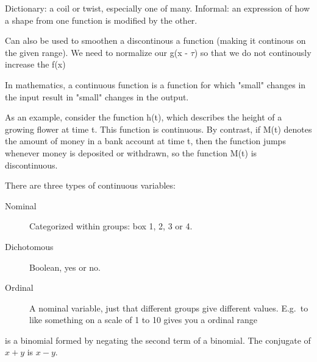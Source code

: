 \begin{definition}[Convolution]
    Dictionary: a coil or twist, especially one of many.\newline
    Informal: an expression of how a shape from one function is modified by 
        the other.

    Can also be used to smoothen a discontinous a function (making it continous 
    on the given range). We need to normalize our g(x - $\tau$) so that we do
    not continously increase the f(x)
\end{definition}

\begin{definition}[Continuous]
In mathematics, a continuous function is a function for which
"small" changes in the input result in "small" changes in the output.

As an example, consider the function h(t), which describes the height of a
growing flower at time t. This function is continuous. By contrast, if M(t)
denotes the amount of money in a bank account at time t, then the function
jumps whenever money is deposited or withdrawn, so the function M(t) is
discontinuous.

\end{definition}

\begin{definition}
    There are three types of continuous variables:
    \begin{center}
    \begin{description}
        \item[Nominal] Categorized within groups: box 1, 2, 3 or 4.
        \item[Dichotomous] Boolean, yes or no.
        \item[Ordinal] A nominal variable, just that different groups give
            different values. E.g.\ to like something on a scale of 1 to 10
            gives you a ordinal range
    \end{description}
\end{center}
\end{definition}

\begin{definition}[Conjugate]
     is a binomial formed by negating the second term of a binomial. The
     conjugate of $x + y$ is $x − y$.

\end{definition}

